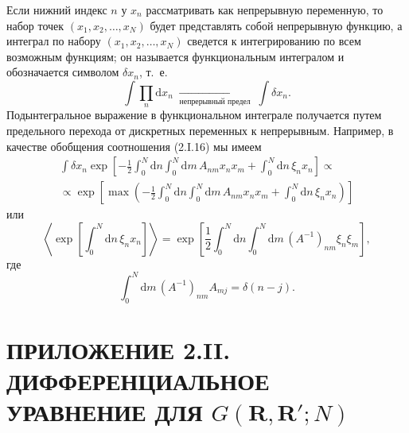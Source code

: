 \documentclass[12pt,a4paper]{article}
\begin{document}
Если нижний индекс $n$ у $x_n$ рассматривать как непрерывную переменную, то набор точек $(x_1, x_2, \dots, x_N)$ будет представлять собой непрерывную функцию, а интеграл по набору $(x_1, x_2, \dots, x_N)$ сведется к интегрированию по всем возможным функциям; он называется функциональным интегралом и обозначается символом $\delta x_n$, т.~е.
\begin{equation*}
\int\!\prod_n \mathrm{d}x_n \;\xrightarrow[\text{непрерывный предел}]{}\; \int\!\delta x_n.
\end{equation*}
Подынтегральное выражение в функциональном интеграле получается путем предельного перехода от дискретных переменных к непрерывным. Например, в качестве обобщения соотношения (2.I.16) мы имеем
\begin{align}
\int\!\delta x_n \exp\left[-\frac{1}{2}\int_0^N\!\mathrm{d}n\int_0^N\!\mathrm{d}m\,A_{nm}x_n x_m + \int_0^N\!\mathrm{d}n\,\xi_n x_n\right] \propto \nonumber\\
\propto \exp\left[\max\left(-\frac{1}{2}\int_0^N\!\mathrm{d}n\int_0^N\!\mathrm{d}m\,A_{nm}x_n x_m + \int_0^N\!\mathrm{d}n\,\xi_n x_n\right)\right] \tag{2.I.32}
\end{align}
или
\begin{equation}
\left\langle\exp\left[\int_0^N\!\mathrm{d}n\,\xi_n x_n\right]\right\rangle = \exp\left[\frac{1}{2}\int_0^N\!\mathrm{d}n\int_0^N\!\mathrm{d}m\,(A^{-1})_{nm}\xi_n \xi_m\right], \tag{2.I.33}
\end{equation}
где
\begin{equation}
\int_0^N\!\mathrm{d}m\,(A^{-1})_{nm}A_{mj} = \delta(n - j). \tag{2.I.34}
\end{equation}

\section*{ПРИЛОЖЕНИЕ 2.II. ДИФФЕРЕНЦИАЛЬНОЕ УРАВНЕНИЕ ДЛЯ $G(\boldsymbol{R}, \boldsymbol{R}'; N)$}
\end{document}
